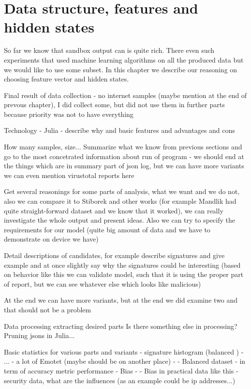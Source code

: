 \chapter{Data structure, features and hidden states}
So far we know that sandbox output can is quite rich. There even such experiments that used machine learning algorithms on all the produced data but we would like to use some subset. In this chapter we describe our reasoning on choosing feature vector and hidden states.

Final result of data collection - no internet samples (maybe mention at the end of prevous chapter), I did collect some, but did not use them in further parts because priority was not to have everything

Technology - Julia
  - describe why and basic features and advantages and cons


How many samples, size...
Summarize what we know from previous sections and go to the most concetrated information about run of program - we should end at the things which are in summary part of json log, but we can have more variants
we can even mention virustotal reports here

Get several reasonings for some parts of analysis, what we want and we do not, also we can compare it to Stiborek and other works (for example Mandlik had quite straight-forward dataset and we know that it worked), we can really investigate the whole output and present ideas. Also we can try to specify the requirements for our model (quite big amount of data and we have to demonstrate on device we have)


Detail descriptions of candidates, for example describe signatures and give example and at once slightly say why the signatures could be interesting (based on behavior like this we can validate model, such that it is using the proper part of report, but we can see whatever else which looks like malicious)

At the end we can have more variants, but at the end we did examine two and that should not be a problem

Data processing
extracting desired parts
Is there something else in processing?
Pruning jsons in Julia...

Basic statistics for various parts and variants
  - signature histogram (balanced )
  - ...
  - a lot of Emotet (maybe should be on another place)
  - - Balanced dataset - in term of accuracy metric performance
  - Bias - - Bias in practical data like this - security data, what are the influences (as an example could be ip addresses...)


